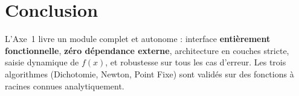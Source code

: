 \documentclass[11pt,a4paper]{article}
\begin{document}
\section{Conclusion}

L'Axe~1 livre un module complet et autonome : interface \textbf{entièrement fonctionnelle},
\textbf{zéro dépendance externe}, architecture en couches stricte, saisie dynamique de
$f(x)$, et robustesse sur tous les cas d'erreur. Les trois algorithmes (Dichotomie, Newton,
Point Fixe) sont validés sur des fonctions à racines connues analytiquement.
\end{document}
